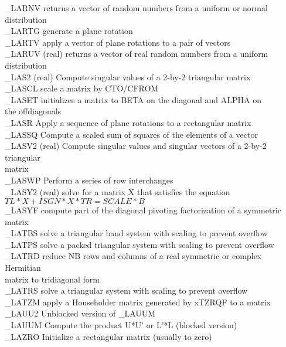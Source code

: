 \begin{tabbing}
\_LARNV \> returns a vector of random numbers from a uniform or normal
distribution \\
\_LARTG \> generate a plane rotation \\
\_LARTV \> apply a vector of plane rotations to a pair of vectors \\
\_LARUV \> (real) returns a vector of real random numbers from a uniform
distribution \\
\_LAS2  \> (real) Compute singular values of a 2-by-2 triangular matrix\\
\_LASCL \> scale a matrix by CTO/CFROM \\
\_LASET \> initializes a matrix to BETA on the diagonal and ALPHA on \\
        \> the offdiagonals \\
\_LASR  \> Apply a sequence of plane rotations to a rectangular matrix\\
\_LASSQ \> Compute a scaled sum of squares of the elements of a vector\\
\_LASV2 \> (real) Compute singular values and singular vectors of a 2-by-2 triangular \\
        \> matrix\\
\_LASWP \> Perform a series of row interchanges\\
\_LASY2 \> (real) solve for a matrix X that satisfies the equation \\
        \> $TL*X + ISGN*X*TR = SCALE*B$ \\
\_LASYF \> compute part of the diagonal pivoting factorization of a symmetric matrix\\
\_LATBS \> solve a triangular band system with scaling to prevent overflow \\
\_LATPS \> solve a packed triangular system with scaling to prevent overflow \\
\_LATRD \> reduce NB rows and columns of a real symmetric or complex Hermitian \\
        \> matrix to tridiagonal form \\
\_LATRS \> solve a triangular system with scaling to prevent overflow \\
\_LATZM \> apply a Householder matrix generated by xTZRQF to a matrix \\
\_LAUU2 \> Unblocked version of \_LAUUM\\
\_LAUUM \> Compute the product U*U' or L'*L (blocked version)\\
\_LAZRO \> Initialize a rectangular matrix (usually to zero)
\end{tabbing}
\clearpage

